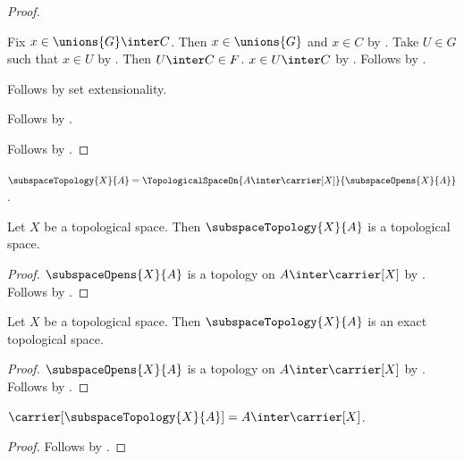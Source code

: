 \begin{proof}
\begin{subproof}
\begin{subproof}
\begin{subproof}
                Fix $x\in\unions{G}\inter C$.
                Then $x\in\unions{G}$ and $x\in C$ by .
                Take $U\in G$ such that $x\in U$
                    by .
                Then $U\inter C\in F$.
                $x\in U\inter C$ by .
                Follows by .
            \end{subproof}
            Follows by set extensionality.
        \end{subproof}
        Follows by .
    \end{subproof}
    Follows by
        .
\end{proof}

\begin{definition}\label{subspace_topology}
    $\subspaceTopology{X}{A}=
        \TopologicalSpaceOn{A\inter\carrier[X]}{\subspaceOpens{X}{A}}$.
\end{definition}

\begin{classification}\label{subspace_topology_is_topological_space}
    Let $X$ be a topological space.
    Then $\subspaceTopology{X}{A}$ is a topological space.
\end{classification}
\begin{proof}
    $\subspaceOpens{X}{A}$ is a topology on
        $A\inter\carrier[X]$
        by .
    Follows by
        .
\end{proof}

\begin{theorem}\label{subspace_topology_is_exact}
    Let $X$ be a topological space.
    Then $\subspaceTopology{X}{A}$ is an exact topological space.
\end{theorem}
\begin{proof}
    $\subspaceOpens{X}{A}$ is a topology on
        $A\inter\carrier[X]$ by
        .
    Follows by
        .
\end{proof}

\begin{proposition}\label{subspace_topology_carrier}
    $\carrier[\subspaceTopology{X}{A}]=A\inter\carrier[X]$.
\end{proposition}
\begin{proof}
    Follows by
        .
\end{proof}

